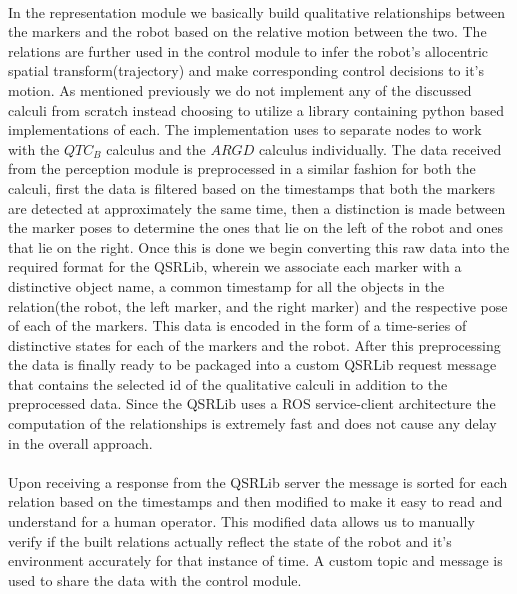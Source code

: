 \paragraph{} In the representation module we basically build qualitative relationships between the markers and the robot based on the relative motion between the two. The relations are further used in the control module to infer the robot's allocentric spatial transform(trajectory) and make corresponding control decisions to it's motion. As mentioned previously we do not implement any of the discussed calculi from scratch instead choosing to utilize a library containing python based implementations of each. The implementation uses to separate nodes to work with the $QTC_B$ calculus and the $ARGD$ calculus individually. The data received from the perception module is preprocessed in a similar fashion for both the calculi, first the data is filtered based on the timestamps that both the markers are detected at approximately the same time, then a distinction is made between the marker poses to determine the ones that lie on the left of the robot and ones that lie on the right. Once this is done we begin converting this raw data into the required format for the QSRLib, wherein we associate each marker with a distinctive object name, a common timestamp for all the objects in the relation(the robot, the left marker, and the right marker) and the respective pose of each of the markers. This data is encoded in the form of a time-series of distinctive states for each of the markers and the robot. After this preprocessing the data is finally ready to be packaged into a custom QSRLib request message that contains the selected id of the qualitative calculi in addition to the preprocessed data. Since the QSRLib uses a ROS service-client architecture the computation of the relationships is extremely fast and does not cause any delay in the overall approach.

\paragraph{} Upon receiving a response from the QSRLib server the message is sorted for each relation based on the timestamps and then modified to make it easy to read and understand for a human operator. This modified data allows us to manually verify if the built relations actually reflect the state of the robot and it's environment accurately for that instance of time. A custom topic and message is used to share the data with the control module.

